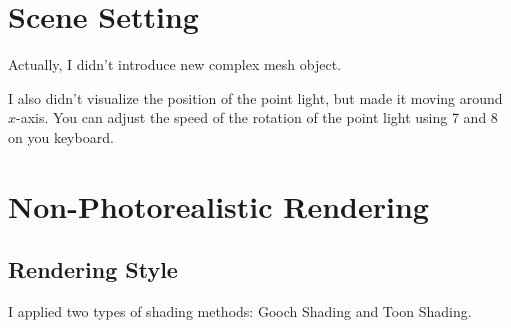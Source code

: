 \documentclass[11pt]{article}
\begin{document}
\section{Scene Setting} \label{sec:1}
Actually, I didn't introduce new complex mesh object.

I also didn't visualize the position of the point light, but made it moving around $x$-axis. You can adjust the speed of the rotation of the point light using 7 and 8 on you keyboard.

\section{Non-Photorealistic Rendering} \label{sec:2}
\subsection{Rendering Style} \label{ssec:2.1}
I applied two types of shading methods: Gooch Shading and Toon Shading.
\end{document}
